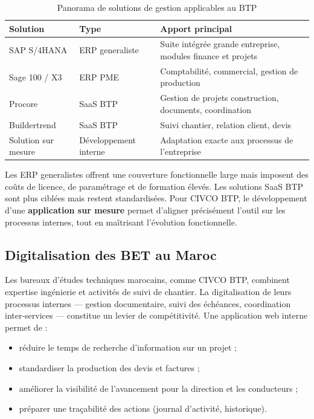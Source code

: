 \begin{table}[H]
\centering
\small
\caption{Panorama de solutions de gestion applicables au BTP}
\label{tab:erp_panorama}
\begin{tabular}{|l|l|p{7.5cm}|}
\hline
\textbf{Solution} & \textbf{Type} & \textbf{Apport principal} \\
\hline
SAP S/4HANA & ERP generaliste & Suite intégrée grande entreprise, modules finance et projets \\
\hline
Sage 100 / X3 & ERP PME & Comptabilité, commercial, gestion de production \\
\hline
Procore~\cite{procore} & SaaS BTP & Gestion de projets construction, documents, coordination \\
\hline
Buildertrend & SaaS BTP & Suivi chantier, relation client, devis \\
\hline
Solution sur mesure & Développement interne & Adaptation exacte aux processus de l'entreprise \\
\hline
\end{tabular}
\end{table}

Les ERP generalistes offrent une couverture fonctionnelle large mais imposent des coûts
de licence, de paramétrage et de formation élevés. Les solutions SaaS BTP sont plus
ciblées mais restent standardisées. Pour CIVCO BTP, le développement d'une
\textbf{application sur mesure} permet d'aligner précisément l'outil sur les processus
internes, tout en maîtrisant l'évolution fonctionnelle.

\subsection{Digitalisation des BET au Maroc}

Les bureaux d'études techniques marocains, comme CIVCO BTP, combinent expertise
ingénierie et activités de suivi de chantier. La digitalisation de leurs processus
internes --- gestion documentaire, suivi des échéances, coordination inter-services ---
constitue un levier de compétitivité. Une application web interne permet de :

\begin{itemize}
  \item réduire le temps de recherche d'information sur un projet ;
  \item standardiser la production des devis et factures ;
  \item améliorer la visibilité de l'avancement pour la direction et les conducteurs ;
  \item préparer une traçabilité des actions (journal d'activité, historique).
\end{itemize}

